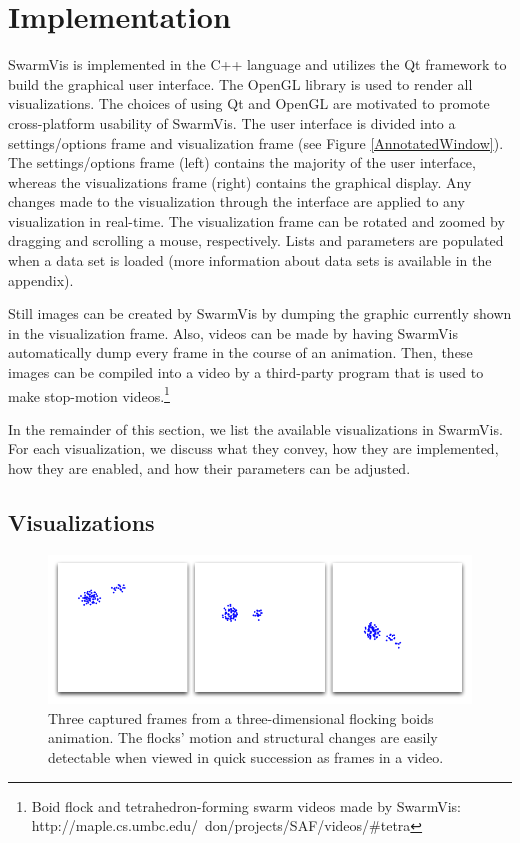 \documentclass[conference]{IEEEtran}
\begin{document}
\section{Implementation}
SwarmVis is implemented in the C++ language and utilizes the Qt framework\cite{Qt:website} to build the graphical user interface.
The OpenGL library is used to render all visualizations.
The choices of using Qt and OpenGL are motivated to promote cross-platform usability of SwarmVis.
The user interface is divided into a settings/options frame and visualization frame (see Figure \ref{AnnotatedWindow}).
The settings/options frame (left) contains the majority of the user interface,
whereas the visualizations frame (right) contains  the graphical display.
Any changes made to the visualization through the interface are applied to any visualization in real-time.
The visualization frame can be rotated and zoomed by dragging and scrolling a mouse, respectively.
Lists and parameters are populated when a data set is loaded (more information about data sets is available in the appendix).

Still images can be created by SwarmVis by dumping the graphic currently shown in the visualization frame.
Also, videos can be made by having SwarmVis automatically dump every frame in the course of an animation.
Then, these images can be compiled into a video by a third-party program that is used to make stop-motion
videos.\footnote{Boid flock and tetrahedron-forming swarm videos made by SwarmVis:\\
 http://maple.cs.umbc.edu/~don/projects/SAF/videos/\#tetra}

In the remainder of this section, we list the available visualizations in SwarmVis.
For each visualization, we discuss what they convey, how they are implemented, how they are enabled,
and how their parameters can be adjusted.


\subsection{Visualizations}\label{visualizations}


\begin{figure}
\centering
\includegraphics[scale=.282]{images/animation.png}
\caption{
Three captured frames from a three-dimensional flocking boids\cite{reynolds1987} animation.
The flocks' motion and structural changes are easily detectable when viewed in quick succession as frames in a video.}
\label{Animation}
\end{figure}
\end{document}
